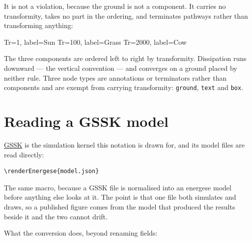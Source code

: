 \documentclass{article}
\begin{document}
It is not a violation, because the ground is not a component. It carries no
transformity, takes no part in the ordering, and terminates pathways rather than
transforming anything:

\begin{center}
\begin{energese}[scale=0.8]
         {Tr=1,    label={Sun}}
     {Tr=100,  label={Grass}}
       {Tr=2000, label={Cow}}
\end{energese}
\end{center}

The three components are ordered left to right by transformity. Dissipation runs
downward --- the vertical convention --- and converges on a ground placed by
neither rule. Three node types are annotations or terminators rather than
components and are exempt from carrying transformity: \texttt{ground},
\texttt{text} and \texttt{box}.

\section{Reading a GSSK model}

\href{https://github.com/energese-project/GSSK}{GSSK} is the simulation kernel this
notation is drawn for, and its model files are read directly:

\begin{verbatim}
\renderEnergese{model.json}
\end{verbatim}

\noindent The same macro, because a GSSK file is normalised into an energese
model before anything else looks at it. The point is that one file both
simulates and draws, so a published figure comes from the model that produced
the results beside it and the two cannot drift.

What the conversion does, beyond renaming fields:
\end{document}
